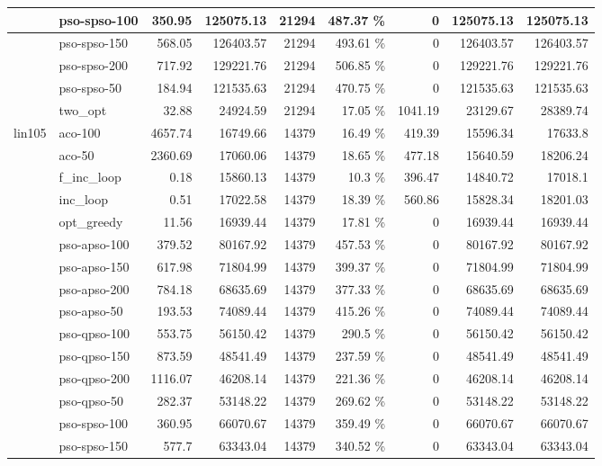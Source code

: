 \documentclass[conference]{IEEEtran}
\begin{document}
\begin{center}
\begin{longtable}[ht]{|l|l|r|r|r|r|r|r|r|}
 & pso-spso-100 & 350.95 & 125075.13 & 21294 & 487.37 \% & 0 & 125075.13 & 125075.13 \\ \hline
 & pso-spso-150 & 568.05 & 126403.57 & 21294 & 493.61 \% & 0 & 126403.57 & 126403.57 \\ \hline
 & pso-spso-200 & 717.92 & 129221.76 & 21294 & 506.85 \% & 0 & 129221.76 & 129221.76 \\ \hline
 & pso-spso-50 & 184.94 & 121535.63 & 21294 & 470.75 \% & 0 & 121535.63 & 121535.63 \\ \hline
 & two\_opt & 32.88 & 24924.59 & 21294 & 17.05 \% & 1041.19 & 23129.67 & 28389.74 \\ \hline
lin105 & aco-100 & 4657.74 & 16749.66 & 14379 & 16.49 \% & 419.39 & 15596.34 & 17633.8 \\ \hline
 & aco-50 & 2360.69 & 17060.06 & 14379 & 18.65 \% & 477.18 & 15640.59 & 18206.24 \\ \hline
 & f\_inc\_loop & 0.18 & 15860.13 & 14379 & 10.3 \% & 396.47 & 14840.72 & 17018.1 \\ \hline
 & inc\_loop & 0.51 & 17022.58 & 14379 & 18.39 \% & 560.86 & 15828.34 & 18201.03 \\ \hline
 & opt\_greedy & 11.56 & 16939.44 & 14379 & 17.81 \% & 0 & 16939.44 & 16939.44 \\ \hline
 & pso-apso-100 & 379.52 & 80167.92 & 14379 & 457.53 \% & 0 & 80167.92 & 80167.92 \\ \hline
 & pso-apso-150 & 617.98 & 71804.99 & 14379 & 399.37 \% & 0 & 71804.99 & 71804.99 \\ \hline
 & pso-apso-200 & 784.18 & 68635.69 & 14379 & 377.33 \% & 0 & 68635.69 & 68635.69 \\ \hline
 & pso-apso-50 & 193.53 & 74089.44 & 14379 & 415.26 \% & 0 & 74089.44 & 74089.44 \\ \hline
 & pso-qpso-100 & 553.75 & 56150.42 & 14379 & 290.5 \% & 0 & 56150.42 & 56150.42 \\ \hline
 & pso-qpso-150 & 873.59 & 48541.49 & 14379 & 237.59 \% & 0 & 48541.49 & 48541.49 \\ \hline
 & pso-qpso-200 & 1116.07 & 46208.14 & 14379 & 221.36 \% & 0 & 46208.14 & 46208.14 \\ \hline
 & pso-qpso-50 & 282.37 & 53148.22 & 14379 & 269.62 \% & 0 & 53148.22 & 53148.22 \\ \hline
 & pso-spso-100 & 360.95 & 66070.67 & 14379 & 359.49 \% & 0 & 66070.67 & 66070.67 \\ \hline
 & pso-spso-150 & 577.7 & 63343.04 & 14379 & 340.52 \% & 0 & 63343.04 & 63343.04 \\ \hline

\end{longtable}
\end{center}
\end{document}
